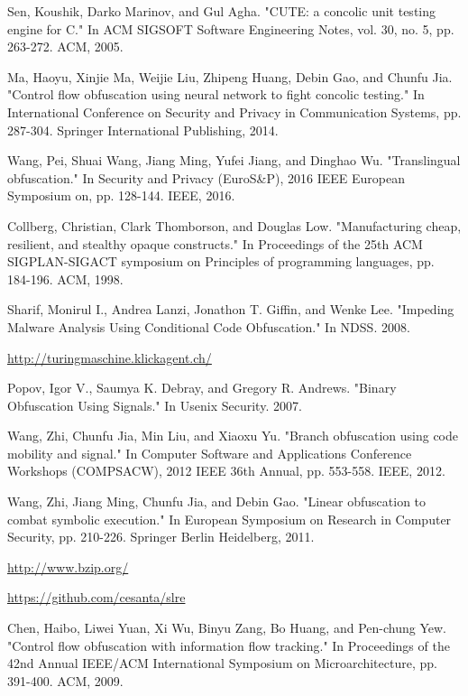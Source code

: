 \documentclass[ms,12pt]{psuthesis}
\begin{document}
\begin{singlespace}
\begin{thebibliography}{99}
\frenchspacing


 Sen, Koushik, Darko Marinov, and Gul Agha. "CUTE: a concolic unit testing engine for C." In ACM SIGSOFT Software Engineering Notes, vol. 30, no. 5, pp. 263-272. ACM, 2005.

 Ma, Haoyu, Xinjie Ma, Weijie Liu, Zhipeng Huang, Debin Gao, and Chunfu Jia. "Control flow obfuscation using neural network to fight concolic testing." In International Conference on Security and Privacy in Communication Systems, pp. 287-304. Springer International Publishing, 2014.

 Wang, Pei, Shuai Wang, Jiang Ming, Yufei Jiang, and Dinghao Wu. "Translingual obfuscation." In Security and Privacy (EuroS\&P), 2016 IEEE European Symposium on, pp. 128-144. IEEE, 2016.

 Collberg, Christian, Clark Thomborson, and Douglas Low. "Manufacturing cheap, resilient, and stealthy opaque constructs." In Proceedings of the 25th ACM SIGPLAN-SIGACT symposium on Principles of programming languages, pp. 184-196. ACM, 1998.

 Sharif, Monirul I., Andrea Lanzi, Jonathon T. Giffin, and Wenke Lee. "Impeding Malware Analysis Using Conditional Code Obfuscation." In NDSS. 2008.


 \url{http://turingmaschine.klickagent.ch/}

 Popov, Igor V., Saumya K. Debray, and Gregory R. Andrews. "Binary Obfuscation Using Signals." In Usenix Security. 2007.

 Wang, Zhi, Chunfu Jia, Min Liu, and Xiaoxu Yu. "Branch obfuscation using code mobility and signal." In Computer Software and Applications Conference Workshops (COMPSACW), 2012 IEEE 36th Annual, pp. 553-558. IEEE, 2012.

 Wang, Zhi, Jiang Ming, Chunfu Jia, and Debin Gao. "Linear obfuscation to combat symbolic execution." In European Symposium on Research in Computer Security, pp. 210-226. Springer Berlin Heidelberg, 2011.

 \url{http://www.bzip.org/}

 \url{https://github.com/cesanta/slre}

 Chen, Haibo, Liwei Yuan, Xi Wu, Binyu Zang, Bo Huang, and Pen-chung Yew. "Control flow obfuscation with information flow tracking." In Proceedings of the 42nd Annual IEEE/ACM International Symposium on Microarchitecture, pp. 391-400. ACM, 2009.


\end{thebibliography}
\end{singlespace}
\end{document}
